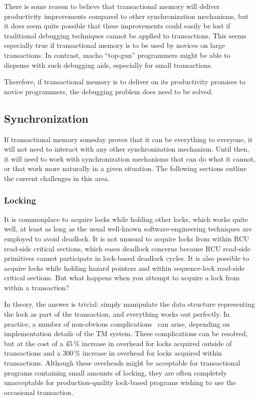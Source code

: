 There is some reason to believe that transactional memory will deliver
productivity improvements compared to other synchronization mechanisms,
but it does seem quite possible that these improvements could easily
be lost if traditional debugging techniques cannot be applied to
transactions.
This seems especially true if transactional memory is to be used by
novices on large transactions.
In contrast, macho ``top-gun'' programmers might be able to dispense with
such debugging aids, especially for small transactions.

Therefore, if transactional memory is to deliver on its productivity
promises to novice programmers, the debugging problem does need to
be solved.

\subsection{Synchronization}
\label{sec:future:Synchronization}

If transactional memory someday proves that it can be everything to everyone,
it will not need to interact with any other synchronization mechanism.
Until then, it will need to work with synchronization mechanisms that
can do what it cannot, or that work more naturally in a given situation.
The following sections outline the current challenges in this area.

\subsubsection{Locking}
\label{sec:future:Locking}

It is commonplace to acquire locks while holding other locks, which works
quite well, at least as long as the usual well-known software-engineering
techniques are employed to avoid deadlock.
It is not unusual to acquire locks from within RCU read-side critical
sections, which eases deadlock concerns because RCU read-side primitives
cannot participate in lock-based deadlock cycles.
It is also possible to acquire locks while holding hazard pointers and
within sequence-lock read-side critical sections.
But what happens when you attempt to acquire a lock from within a transaction?

In theory, the answer is trivial: simply manipulate the data structure
representing the lock as part of the transaction, and everything works
out perfectly.
In practice, a number of non-obvious complications~\cite{Volos2008TRANSACT}
can arise, depending on implementation details of the TM system.
These complications can be resolved, but at the cost of a 45\,\% increase in
overhead for locks acquired outside of transactions and a 300\,\% increase
in overhead for locks acquired within transactions.
Although these overheads might be acceptable for transactional
programs containing small amounts of locking, they are often completely
unacceptable for production-quality lock-based programs wishing to use
the occasional transaction.

